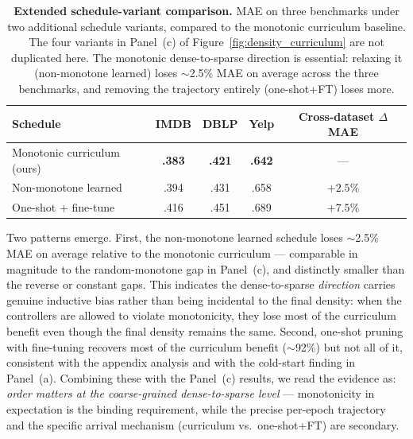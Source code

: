 \documentclass[10pt]{article}
\theoremstyle{plain}
\theoremstyle{definition}
\begin{document}
\begin{table}[ht!]
\centering
\caption{\textbf{Extended schedule-variant comparison.} MAE on three benchmarks under two additional schedule variants, compared to the monotonic curriculum baseline. The four variants in Panel~(c) of Figure~\ref{fig:density_curriculum} are not duplicated here. The monotonic dense-to-sparse direction is essential: relaxing it (non-monotone learned) loses $\sim$2.5\% MAE on average across the three benchmarks, and removing the trajectory entirely (one-shot+FT) loses more.}
\label{tab:schedule_variants}
\setlength{\tabcolsep}{6pt}
\renewcommand{\arraystretch}{1.1}
\small
\begin{tabular}{l ccc c}
\toprule
\textbf{Schedule} & \textbf{IMDB} & \textbf{DBLP} & \textbf{Yelp} & \textbf{Cross-dataset $\Delta$ MAE} \\
\midrule
\rowcolor{blue!10}
Monotonic curriculum (ours)   & \textbf{.383} & \textbf{.421} & \textbf{.642} & --- \\
Non-monotone learned          & .394 & .431 & .658 & $+2.5\%$ \\   
One-shot + fine-tune          & .416 & .451 & .689 & $+7.5\%$ \\   
\bottomrule
\end{tabular}
\end{table}

Two patterns emerge. First, the non-monotone learned schedule loses $\sim$2.5\% MAE on average relative to the monotonic curriculum --- comparable in magnitude to the random-monotone gap in Panel~(c), and distinctly smaller than the reverse or constant gaps. This indicates the dense-to-sparse \emph{direction} carries genuine inductive bias rather than being incidental to the final density: when the controllers are allowed to violate monotonicity, they lose most of the curriculum benefit even though the final density remains the same. Second, one-shot pruning with fine-tuning recovers most of the curriculum benefit ($\sim$92\%) but not all of it, consistent with the appendix analysis and with the cold-start finding in Panel~(a). Combining these with the Panel~(c) results, we read the evidence as: \emph{order matters at the coarse-grained dense-to-sparse level} --- monotonicity in expectation is the binding requirement, while the precise per-epoch trajectory and the specific arrival mechanism (curriculum vs.\ one-shot+FT) are secondary.
\end{document}
